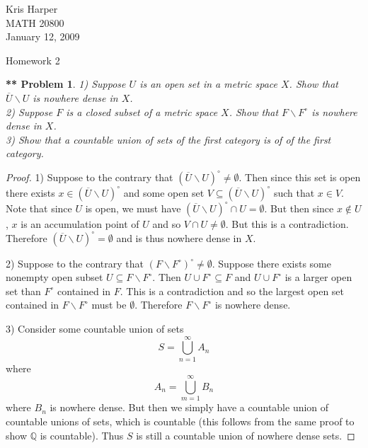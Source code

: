 \documentclass{article}
\newtheorem{**}{** Problem}
\begin{document}
\begin{flushright}
Kris Harper\\

MATH 20800\\

January 12, 2009
\end{flushright}

\begin{center}
Homework 2
\end{center}

\begin{flushleft}

\begin{**}
1) Suppose $U$ is an open set in a metric space $X$. Show that $\overline{U} \backslash U$ is nowhere dense in $X$.\\
2) Suppose $F$ is a closed subset of a metric space $X$. Show that $F \backslash F^{\circ}$ is nowhere dense in $X$.\\
3) Show that a countable union of sets of the first category is of of the first category.
\end{**}
\begin{proof}
1) Suppose to the contrary that $(\overline{U} \backslash U)^{\circ} \neq \emptyset$. Then since this set is open there exists $x \in (\overline{U} \backslash U)^{\circ}$ and some open set $V \subseteq (\overline{U} \backslash U)^{\circ}$ such that $x \in V$. Note that since $U$ is open, we must have $(\overline{U} \backslash U)^{\circ} \cap U = \emptyset$. But then since $x \notin U$, $x$ is an accumulation point of $U$ and so $V \cap U \neq \emptyset$. But this is a contradiction. Therefore $(\overline{U} \backslash U)^{\circ} = \emptyset$ and is thus nowhere dense in $X$.\newline

2) Suppose to the contrary that $(F \backslash F^{\circ})^{\circ} \neq \emptyset$. Suppose there exists some nonempty open subset $U \subseteq F \backslash F^{\circ}$. Then $U \cup F^{\circ} \subseteq F$ and $U \cup F^{\circ}$ is a larger open set than $F^{\circ}$ contained in $F$. This is a contradiction and so the largest open set contained in $F \backslash F^{\circ}$ must be $\emptyset$. Therefore $F \backslash F^{\circ}$ is nowhere dense.\newline

3) Consider some countable union of sets
\[
S = \bigcup_{n=1}^{\infty} A_n
\]
where
\[
A_n = \bigcup_{m=1}^{\infty} B_n
\]
where $B_n$ is nowhere dense. But then we simply have a countable union of countable unions of sets, which is countable (this follows from the same proof to show $\mathbb{Q}$ is countable). Thus $S$ is still a countable union of nowhere dense sets.
\end{proof}


\end{flushleft}
\end{document}
